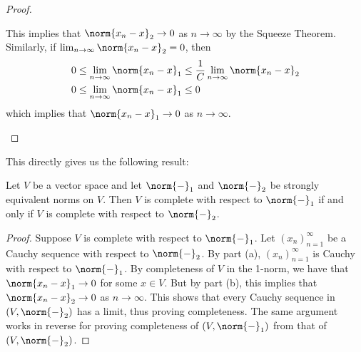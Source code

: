 \begin{proof}
\begin{enumerate}[label=(\alph*)]
     This implies that \( \norm{x_n-x}_2\to 0 \) as \( n\to\infty \) by the Squeeze Theorem. Similarly, if \( \lim_{n\to\infty}\norm{x_n-x}_2=0 \), then
     \begin{align*}
       0&\leq\lim_{n\to\infty}\norm{x_n-x}_1\leq \frac{1}{C}\lim_{n\to\infty}\norm{x_n-x}_2\\
       0&\leq\lim_{n\to\infty}\norm{x_n-x}_1\leq 0
     \end{align*}
     which implies that \( \norm{x_n-x}_1\to 0 \) as \( n\to\infty \).
   \end{enumerate}
 \end{proof}

 This directly gives us the following result:
 \begin{proposition}
   Let \( V \) be a vector space and let \( \norm{-}_1 \) and \( \norm{-}_2 \) be strongly equivalent norms on \( V \). Then \( V \) is complete with respect to \( \norm{-}_1 \) if and only if \( V \) is complete with respect to \( \norm{-}_2 \).
 \end{proposition}
 \begin{proof}
   Suppose \( V \) is complete with respect to \( \norm{-}_1 \). Let \( (x_n)_{n=1}^\infty \) be a Cauchy sequence with respect to \( \norm{-}_2 \). By  part (a), \( (x_n)_{n=1}^\infty \) is Cauchy with respect to \( \norm{-}_1 \). By completeness of \( V \) in the 1-norm, we have that \( \norm{x_n-x}_1\to 0 \) for some \( x\in V \). But by  part (b), this implies that \( \norm{x_n-x}_2\to 0 \) as \( n\to\infty \). This shows that every Cauchy sequence in \( (V,\norm{-}_2) \) has a limit, thus proving completeness. The same argument works in reverse for proving completeness of \( (V,\norm{-}_1) \) from that of \( (V,\norm{-}_2) \).
 \end{proof}

